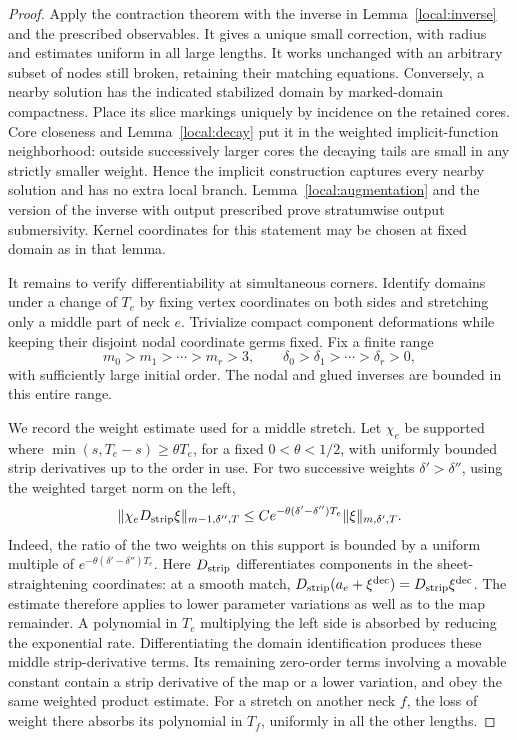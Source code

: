 \begin{proof}
Apply the contraction theorem with the inverse in
Lemma~\ref{local:inverse} and the prescribed observables.  It gives a
unique small correction, with radius and estimates uniform in all
large lengths.  It works unchanged with an arbitrary subset of nodes
still broken, retaining their matching equations.  Conversely, a
nearby solution has the indicated stabilized domain by marked-domain
compactness.  Place its slice markings uniquely by incidence on the
retained cores.  Core closeness and Lemma~\ref{local:decay} put it in
the weighted implicit-function neighborhood: outside successively
larger cores the decaying tails are small in any strictly smaller
weight.  Hence the implicit construction captures every nearby
solution and has no extra local branch.  Lemma~\ref{local:augmentation}
and the version of the inverse with output prescribed prove
stratumwise output submersivity.  Kernel coordinates for this
statement may be chosen at fixed domain as in that lemma.

It remains to verify differentiability at simultaneous corners.
Identify domains under a change of $T_e$ by fixing vertex coordinates
on both sides and stretching only a middle part of neck $e$.
Trivialize compact component deformations while keeping their disjoint
nodal coordinate germs fixed.  Fix a finite range
\[
 m_0>m_1>\cdots>m_r>3,\qquad
 \delta_0>\delta_1>\cdots>\delta_r>0,
\]
with sufficiently large initial order.  The nodal and glued inverses
are bounded in this entire range.

We record the weight estimate used for a middle stretch.
Let $\chi_e$ be supported where
$\min(s,T_e-s)\geq\theta T_e$, for a fixed $0<\theta<1/2$, with
uniformly bounded strip derivatives up to the order in use.
For two successive weights $\delta'>\delta''$, using the weighted
target norm on the left,
\[
 \|\chi_e D_{\rm strip}\xi\|_{m-1,\delta'',T}
 \leq C e^{-\theta(\delta'-\delta'')T_e}
                   \|\xi\|_{m,\delta',T}.
\]
Indeed, the ratio of the two weights on this support is bounded by a
uniform multiple of
$e^{-\theta(\delta'-\delta'')T_e}$.  Here $D_{\rm strip}$ differentiates
components in the sheet-straightening coordinates: at a smooth match,
$D_{\rm strip}(a_e+\xi^{\rm dec})=D_{\rm strip}\xi^{\rm dec}$.
The estimate therefore applies to lower parameter variations as well
as to the map remainder.  A polynomial in $T_e$ multiplying the
left side is absorbed by reducing the exponential rate.
Differentiating the domain identification produces these middle
strip-derivative terms.  Its remaining zero-order terms involving a
movable constant contain a strip derivative of the map or a lower
variation, and obey the same weighted product estimate.
For a stretch on another neck $f$, the loss of weight there absorbs
its polynomial in $T_f$, uniformly in all the other lengths.


\end{proof}
